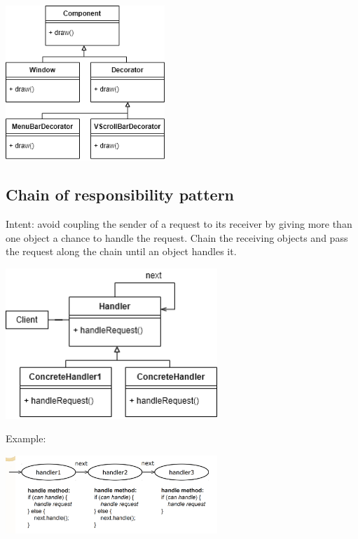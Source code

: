 \documentclass[8pt, letterpaper, titlepage]{article}
\begin{document}
\begin{multicols*}{2}
    \includegraphics[width=6cm]{decorator.png}

    \subsection*{Chain of responsibility pattern}
    Intent: avoid coupling the sender of a request to its receiver by giving more than one object a chance to handle the request. Chain the receiving objects and pass the request along the chain until an object handles it.
    \begin{center} 
        \includegraphics[width=8cm]{respons.png}
    \end{center}
    Example:
    \begin{center} 
        \includegraphics[width=8cm]{handler.png}
    \end{center}


\end{multicols*}
\end{document}
